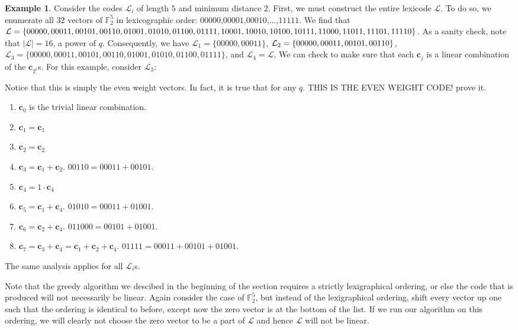 \documentclass{article}
\numberwithin{theorem}{subsection}
\numberwithin{lemma}{subsection}
\theoremstyle{definition}
\newtheorem{exmp}{Example}
\numberwithin{exmp}{subsection}
\theoremstyle{definition}
\numberwithin{defn}{subsection}
\theoremstyle{definition}
\numberwithin{claim}{subsection}
\begin{document}
\begin{exmp}
Consider the codes $\mathcal{L}_i$ of length $5$ and minimum distance $2$.  First, we must construct the entire lexicode $\mathcal{L}$.  To do so, we enumerate
all 32 vectors of $\mathbb{F}_2^5$ in lexicographic order: $00000$,$00001$,$00010$,$\ldots$,$11111$.  We find that $\mathcal{L} = \{00000, 00011,00101,00110,01001,
01010,01100,01111,10001,10010,\\ 10100,10111,11000,11011,11101,11110\}$.  As a sanity check, note that $\left | \mathcal{L} \right | = 16$, a power of $q$.  Consequently, we have
$\mathcal{L}_1 = \{00000,00011\}$, $\mathcal{L}_2 = \{00000, 00011,00101,\\ 00110\}$, $\mathcal{L}_3 = \{00000, 00011,00101,00110,01001,01010,01100,01111\}$, and
$\mathcal{L}_4 = \mathcal{L}$. We can check to make sure that each $\mathbf{c}_j$ is a linear combination of the $\mathbf{c}_{2^i}$s. For this example, consider $\mathcal{L}_3$:  

Notice that this is simply the even weight vectors.  In fact, it is true that
for any $q$.
THIS IS THE EVEN WEIGHT CODE! prove it.


\begin{enumerate}%
\item $\mathbf{c}_0$ is the trivial linear combination.
\item $\mathbf{c}_1 = \mathbf{c}_1$
\item $\mathbf{c}_2 = \mathbf{c}_2$
\item $\mathbf{c}_3 = \mathbf{c}_1 + \mathbf{c}_2$.  $00110 = 00011+ 00101$.
\item $\mathbf{c}_4 = 1\cdot\mathbf{c}_4$
\item $\mathbf{c}_5 = \mathbf{c}_1 + \mathbf{c}_4$. $01010 = 00011 + 01001$.
\item $\mathbf{c}_6 = \mathbf{c}_2 + \mathbf{c}_4$. $011000 = 00101 + 01001$.
\item $\mathbf{c}_7 = \mathbf{c}_3 + \mathbf{c}_4 = \mathbf{c}_1 + \mathbf{c}_2 + \mathbf{c}_4$. $01111 = 00011 + 00101+01001$.
\end{enumerate}

The same analysis applies for all $\mathcal{L}_i$s.

\end{exmp}

Note that the greedy algorithm we descibed in the beginning of the section requires a strictly lexigraphical ordering, or else the code that is produced will not necessarily
be linear.  Again consider the case of $\mathbb{F}_2^5$, but instead of the lexigraphical ordering, shift every vector up one such that the ordering is identical to before, except now the
zero vector is at the bottom of the list.  If we run our algorithm on this ordering, we will clearly not choose the zero vector to be a part of $\mathcal{L}$ and hence 
$\mathcal{L}$ will not be linear.  
\end{document}
